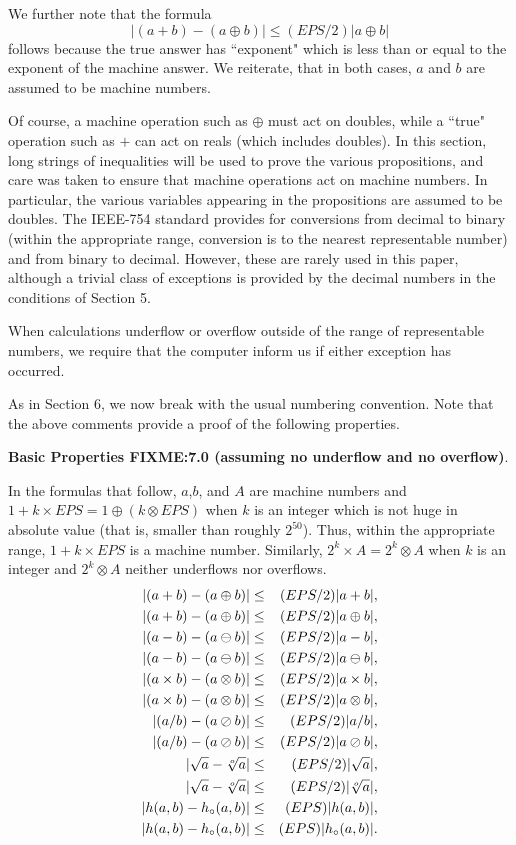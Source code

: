 We further note that the formula 
$$|(a + b) - (a \oplus b)| \leq (EPS/2) |a \oplus b|$$
follows because the true answer has ``exponent" which is less than or equal to the exponent of the machine answer.  We reiterate, that in both cases, $a$ and $b$ are assumed to be machine numbers.

Of course, a machine operation such as $\oplus$ must act on doubles, while a ``true" operation such as $+$ can act on reals (which includes doubles).
In this section, long strings of inequalities will be used to prove the various propositions, and care was taken to ensure that machine operations act on machine numbers.  In particular, the various variables appearing in the propositions are assumed to be doubles. The IEEE-754 standard provides for conversions from decimal to binary (within the appropriate range, conversion is to the nearest representable number) and from binary to decimal.  However, these are rarely used in this paper, although a trivial class of exceptions is provided by the decimal numbers in the conditions of
Section 5.

When calculations underflow or overflow outside of the range of representable numbers, we require that the computer inform us if either exception has occurred.  

As in Section 6, we now break with the usual numbering convention.  Note that the above comments provide a proof of the
following properties.

 {\bf Basic Properties FIXME:7.0 (assuming no underflow and no overflow)}.

In the formulas that follow, $a$,$b$, and $A$ are machine numbers and
$1 + k \times EPS = 1 \oplus (k \otimes EPS)$ when $k$ is an integer which is not huge in absolute value (that is, 
smaller than roughly $2^{50}$).  Thus, within the appropriate range,  $1 + k \times EPS$ is a machine number.  Similarly,
$2^k
\times A = 2^k \otimes A$ when $k$ is an integer and  $2^k \otimes A$ neither underflows nor overflows.
\begin{eqnarray*}
|(a + b) - (a \oplus b)| &\leq& (EPS/2) |a + b|,\\
|(a + b) - (a \oplus b)|&\leq& (EPS/2) |a \oplus b|,\\
|(a - b) - (a \ominus b)| &\leq& (EPS/2) |a - b|,\\
|(a - b) - (a \ominus b)|&\leq& (EPS/2) |a \ominus b|,\\
|(a \times b) - (a \otimes b)| &\leq& (EPS/2) |a \times b|,\\
|(a \times b) - (a \otimes b)| &\leq&(EPS/2) |a \otimes b|,\\
|(a / b) - (a \oslash b)| &\leq& (EPS/2) |a / b|,\\
|(a / b) - (a \oslash b)| &\leq& (EPS/2) |a \oslash b|,\\
|\sqrt a - \root o \of a| &\leq& (EPS/2) |\sqrt a|,\\
|\sqrt a - \root o \of a|  &\leq&  (EPS/2) |\root o \of a|,\\
|h(a,b) - h_\circ(a,b)| &\leq& (EPS) |h(a,b)|,\\
|h(a,b) - h_\circ(a,b)| &\leq&   (EPS) |h_\circ(a,b)|.
\end{eqnarray*}

